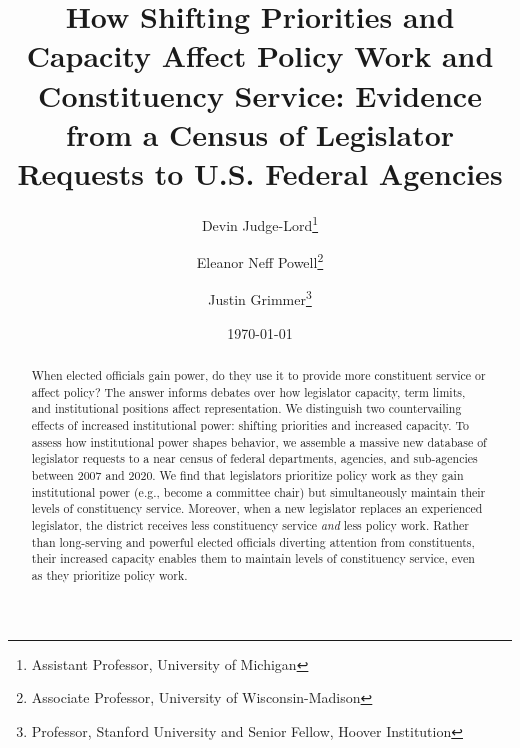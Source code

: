 \documentclass[12pt]{article}
\title{How Shifting Priorities and Capacity Affect Policy Work and Constituency Service: Evidence from a Census of Legislator Requests to U.S. Federal Agencies}
\author{Devin Judge-Lord\thanks{Assistant Professor, University of Michigan} \and Eleanor Neff Powell\thanks{Associate Professor, University of Wisconsin-Madison} \and Justin Grimmer\thanks{Professor, Stanford University and Senior Fellow, Hoover Institution} }
\date{\today}
\begin{document}
\maketitle

\begin{abstract}
When elected officials gain power, do they use it to provide more constituent service or affect policy? The answer informs debates over how legislator capacity, term limits, and institutional positions affect representation. 
We distinguish two countervailing effects of increased institutional power: shifting priorities and increased capacity. 
To assess how institutional power shapes behavior, we assemble a massive new database of  legislator requests to a near census of federal departments, agencies, and sub-agencies between 2007 and 2020.
We find that legislators prioritize policy work as they gain institutional power (e.g., become a committee chair) but simultaneously maintain their levels of constituency service.
Moreover, when a new legislator replaces an experienced legislator, the district receives less constituency service \textit{and} less policy work.
Rather than long-serving and powerful elected officials diverting attention from constituents, their increased capacity enables them to maintain levels of constituency service, even as they prioritize policy work.


\end{abstract}
\end{document}
